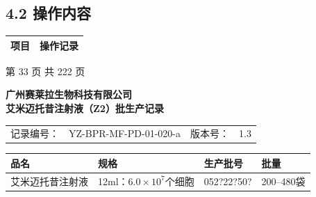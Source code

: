 \documentclass[UTF8,10pt,a4paper,fontset=fandol]{ctexart}
\renewcommand{\arraystretch}{1.15}
\newcommand{\fieldvalue}[1]{#1}
\newcommand{\handwritten}[1]{#1}
\begin{document}
\subsection*{4.2 操作内容}

\begin{tabularx}{\textwidth}{|X|X|}
\hline
项目 & 操作记录\\
\hline
\end{tabularx}

\begin{center}
第 33 页 共 222 页
\end{center}

\newpage

\begin{center}
\textbf{广州赛莱拉生物科技有限公司}\\
\textbf{\large 艾米迈托昔注射液（Z2）批生产记录}
\end{center}

\noindent
\begin{tabularx}{\textwidth}{@{}lXlX@{}}
记录编号：&
\fieldvalue{YZ-BPR-MF-PD-01-020-a}
&
版本号：&
\fieldvalue{1.3}
\end{tabularx}

\vspace{2mm}

\renewcommand{\arraystretch}{1.35}
\begin{tabularx}{\textwidth}{|>{\centering\arraybackslash}p{}|>{\centering\arraybackslash}p{}|>{\centering\arraybackslash}p{}|>{\centering\arraybackslash}X|}
\hline
\textbf{品名} & \textbf{规格} & \textbf{生产批号} & \textbf{批量} \\
\hline
\fieldvalue{艾米迈托昔注射液}
&
\fieldvalue{12ml：$6.0\times10^{7}$个细胞}
&
\fieldvalue{\handwritten{052?22?50?}}
&
\fieldvalue{200--480袋}
\\
\hline
\end{tabularx}

\vspace{1mm}
\end{document}

